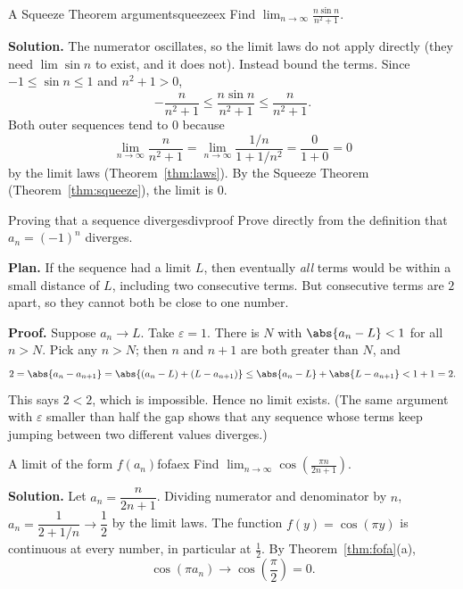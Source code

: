 \documentclass[11pt]{article}
\begin{document}
\begin{exmp}{A Squeeze Theorem argument}{squeezeex}
Find $\displaystyle\lim_{n\to\infty}\frac{n\sin n}{n^2+1}$.

\textbf{Solution.} The numerator oscillates, so the limit laws do not apply directly (they need $\lim\sin n$ to exist, and it does not). Instead bound the terms. Since $-1\le\sin n\le1$ and $n^2+1>0$,
\[
-\frac{n}{n^2+1}\le\frac{n\sin n}{n^2+1}\le\frac{n}{n^2+1}.
\]
Both outer sequences tend to $0$ because
\[
\lim_{n\to\infty}\frac{n}{n^2+1}=\lim_{n\to\infty}\frac{1/n}{1+1/n^2}=\frac{0}{1+0}=0
\]
by the limit laws (Theorem~\ref{thm:laws}).
By the Squeeze Theorem (Theorem~\ref{thm:squeeze}), the limit is $0$.
\end{exmp}

\begin{exmp}{Proving that a sequence diverges}{divproof}
Prove directly from the definition that $a_n=(-1)^n$ diverges.

\textbf{Plan.} If the sequence had a limit $L$, then eventually \emph{all} terms would be within a small distance of $L$, including two consecutive terms. But consecutive terms are $2$ apart, so they cannot both be close to one number.

\textbf{Proof.} Suppose $a_n\to L$. Take $\varepsilon=1$. There is $N$ with $\abs{a_n-L}<1$ for all $n>N$. Pick any $n>N$; then $n$ and $n+1$ are both greater than $N$, and
\[
2=\abs{a_n-a_{n+1}}=\abs{(a_n-L)+(L-a_{n+1})}\le\abs{a_n-L}+\abs{L-a_{n+1}}<1+1=2 .
\]
This says $2<2$, which is impossible. Hence no limit exists. (The same argument with $\varepsilon$ smaller than half the gap shows that any sequence whose terms keep jumping between two different values diverges.)
\end{exmp}

\begin{exmp}{A limit of the form $f(a_n)$}{fofaex}
Find $\displaystyle\lim_{n\to\infty}\cos\!\left(\frac{\pi n}{2n+1}\right)$.

\textbf{Solution.} Let $a_n=\dfrac{n}{2n+1}$. Dividing numerator and denominator by $n$, $a_n=\dfrac{1}{2+1/n}\to\dfrac12$ by the limit laws.
The function $f(y)=\cos(\pi y)$ is continuous at every number, in particular at $\frac12$. By Theorem~\ref{thm:fofa}(a),
\[
\cos(\pi a_n)\to\cos\!\left(\frac\pi2\right)=0 .
\]
\end{exmp}
\end{document}

